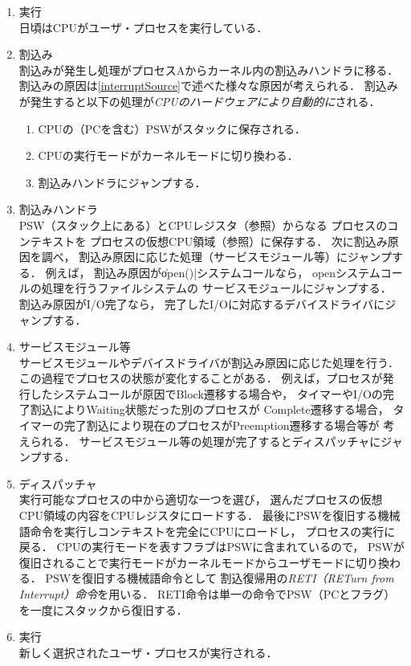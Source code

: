 \begin{enumerate}
\item 実行 \\
  日頃はCPUがユーザ・プロセスを実行している．
\item 割込み \\
  割込みが発生し処理がプロセスAからカーネル内の割込みハンドラに移る．
  割込みの原因は\ref{interruptSource}で述べた様々な原因が考えられる．
  割込みが発生すると以下の処理が\emph{CPUのハードウェアにより自動的に}される．
  \begin{enumerate}
  \item CPUの（PCを含む）PSWがスタックに保存される．
  \item CPUの実行モードがカーネルモードに切り換わる．
  \item 割込みハンドラにジャンプする．
  \end{enumerate}
\item 割込みハンドラ \\
  PSW（スタック上にある）とCPUレジスタ（参照）からなる
  プロセスのコンテキストを
  プロセスの仮想CPU領域（参照）に保存する．
  次に割込み原因を調べ，
  割込み原因に応じた処理（サービスモジュール等）にジャンプする．
  例えば，
  割込み原因が\|open()|システムコールなら，
  openシステムコールの処理を行うファイルシステムの
  サービスモジュールにジャンプする．
  割込み原因がI/O完了なら，
  完了したI/Oに対応するデバイスドライバにジャンプする．
\item サービスモジュール等 \\
  サービスモジュールやデバイスドライバが割込み原因に応じた処理を行う．
  この過程でプロセスの状態が変化することがある．
  例えば，プロセスが発行したシステムコールが原因でBlock遷移する場合や，
  タイマーやI/Oの完了割込によりWaiting状態だった別のプロセスが
  Complete遷移する場合，
  タイマーの完了割込により現在のプロセスがPreemption遷移する場合等が
  考えられる．
  サービスモジュール等の処理が完了するとディスパッチャにジャンプする．
\item ディスパッチャ \\
  実行可能なプロセスの中から適切な一つを選び，
  選んだプロセスの仮想CPU領域の内容をCPUレジスタにロードする．
  最後にPSWを復旧する機械語命令を実行しコンテキストを完全にCPUにロードし，
  プロセスの実行に戻る．
  CPUの実行モードを表すフラブはPSWに含まれているので，
  PSWが復旧されることで実行モードがカーネルモードからユーザモードに切り換わる．
  PSWを復旧する機械語命令として
  割込復帰用の\emph{RETI（RETurn from Interrupt）命令}を用いる．
  RETI命令は単一の命令でPSW（PCとフラグ）を一度にスタックから復旧する．
\item 実行 \\
  新しく選択されたユーザ・プロセスが実行される．
\end{enumerate}

